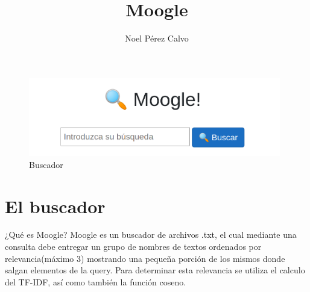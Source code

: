 \documentclass{beamer}
\title{Moogle}
\author{Noel Pérez Calvo}
\begin{document}
\begin{frame}
    \begin{figure}[h]
      \center
      \includegraphics[width=11cm]{moogle.png}
      \caption{Buscador}
      \label{fig:logo}
    \end{figure}
  \end{frame} 

  \section{El buscador}
  \begin{frame}{¿Qué es Moogle?}
    Moogle es un buscador de archivos .txt, el cual mediante una consulta debe entregar un grupo de nombres de textos ordenados por relevancia(máximo 3) mostrando una pequeña porción de los mismos donde salgan elementos de la query. Para determinar esta relevancia se utiliza el calculo del TF-IDF, así como también la función coseno.  
  
  \end{frame}
\end{document}
